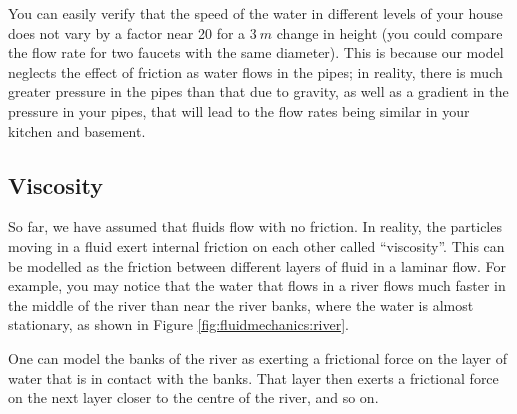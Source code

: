 {{\begin{example}
You can easily verify that the speed of the water in different levels of your house does not vary by a factor near 20 for a $\SI{3}{m}$ change in height (you could compare the flow rate for two faucets with the same diameter). This is because our model neglects the effect of friction as water flows in the pipes; in reality, there is much greater pressure in the pipes than that due to gravity, as well as a gradient in the pressure in your pipes, that will lead to the flow rates being similar in your kitchen and basement.
\end{example}

\subsection{Viscosity}
So far, we have assumed that fluids flow with no friction. In reality, the particles moving in  a fluid exert internal friction on each other called ``viscosity''. This can be modelled as the friction between different layers of fluid in a laminar flow. For example, you may notice that the water that flows in a river flows much faster in the middle of the river than near the river banks, where the water is almost stationary, as shown in Figure \ref{fig:fluidmechanics:river}. 

One can model the banks of the river as exerting a frictional force on the layer of water that is in contact with the banks. That layer then exerts a frictional force on the next layer closer to the centre of the river, and so on. 

}}
